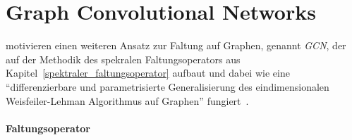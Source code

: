 \section{Graph Convolutional Networks}
\label{graph_convolutional_networks}

\citeauthor{gcn} motivieren einen weiteren Ansatz zur Faltung auf Graphen, genannt \emph{\gls{GCN}}, der auf der Methodik des spekralen Faltungsoperators aus Kapitel~\ref{spektraler_faltungsoperator} aufbaut und dabei wie eine \enquote{differenzierbare und parametrisierte Generalisierung des eindimensionalen Weisfeiler-Lehman Algorithmus auf Graphen} fungiert~\cite{gcn}.

\paragraph{Faltungsoperator}
\label{gcn_faltungsoperator}

